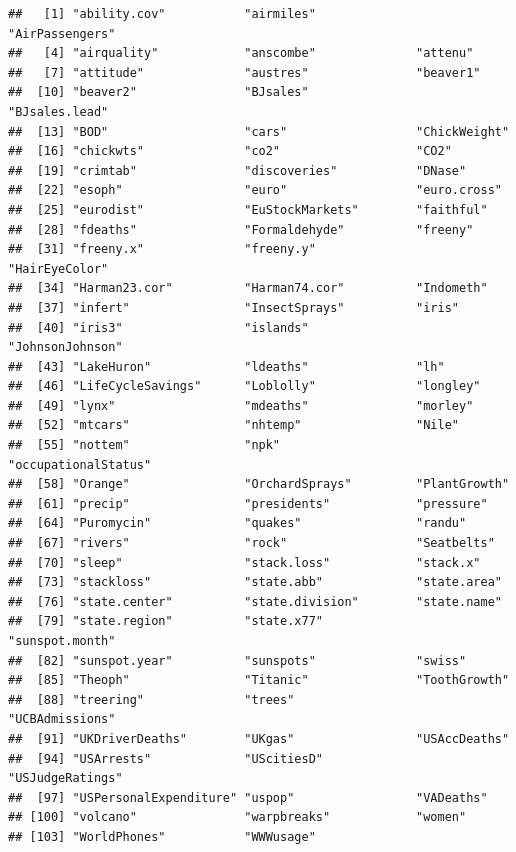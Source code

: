 \documentclass[
]{book}
\begin{document}
\begin{verbatim}
##   [1] "ability.cov"           "airmiles"              "AirPassengers"        
##   [4] "airquality"            "anscombe"              "attenu"               
##   [7] "attitude"              "austres"               "beaver1"              
##  [10] "beaver2"               "BJsales"               "BJsales.lead"         
##  [13] "BOD"                   "cars"                  "ChickWeight"          
##  [16] "chickwts"              "co2"                   "CO2"                  
##  [19] "crimtab"               "discoveries"           "DNase"                
##  [22] "esoph"                 "euro"                  "euro.cross"           
##  [25] "eurodist"              "EuStockMarkets"        "faithful"             
##  [28] "fdeaths"               "Formaldehyde"          "freeny"               
##  [31] "freeny.x"              "freeny.y"              "HairEyeColor"         
##  [34] "Harman23.cor"          "Harman74.cor"          "Indometh"             
##  [37] "infert"                "InsectSprays"          "iris"                 
##  [40] "iris3"                 "islands"               "JohnsonJohnson"       
##  [43] "LakeHuron"             "ldeaths"               "lh"                   
##  [46] "LifeCycleSavings"      "Loblolly"              "longley"              
##  [49] "lynx"                  "mdeaths"               "morley"               
##  [52] "mtcars"                "nhtemp"                "Nile"                 
##  [55] "nottem"                "npk"                   "occupationalStatus"   
##  [58] "Orange"                "OrchardSprays"         "PlantGrowth"          
##  [61] "precip"                "presidents"            "pressure"             
##  [64] "Puromycin"             "quakes"                "randu"                
##  [67] "rivers"                "rock"                  "Seatbelts"            
##  [70] "sleep"                 "stack.loss"            "stack.x"              
##  [73] "stackloss"             "state.abb"             "state.area"           
##  [76] "state.center"          "state.division"        "state.name"           
##  [79] "state.region"          "state.x77"             "sunspot.month"        
##  [82] "sunspot.year"          "sunspots"              "swiss"                
##  [85] "Theoph"                "Titanic"               "ToothGrowth"          
##  [88] "treering"              "trees"                 "UCBAdmissions"        
##  [91] "UKDriverDeaths"        "UKgas"                 "USAccDeaths"          
##  [94] "USArrests"             "UScitiesD"             "USJudgeRatings"       
##  [97] "USPersonalExpenditure" "uspop"                 "VADeaths"             
## [100] "volcano"               "warpbreaks"            "women"                
## [103] "WorldPhones"           "WWWusage"
\end{verbatim}
\end{document}
